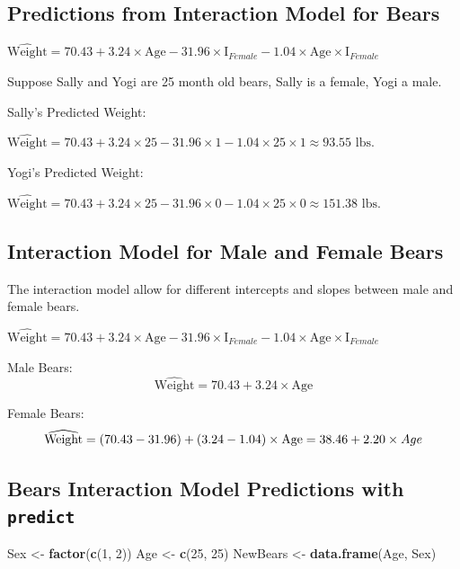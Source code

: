 \documentclass[]{book}
\newenvironment{Shaded}{\begin{snugshade}}{\end{snugshade}}
\newcommand{\KeywordTok}[1]{\textcolor[rgb]{0.13,0.29,0.53}{\textbf{#1}}}
\newcommand{\DecValTok}[1]{\textcolor[rgb]{0.00,0.00,0.81}{#1}}
\newcommand{\StringTok}[1]{\textcolor[rgb]{0.31,0.60,0.02}{#1}}
\newcommand{\NormalTok}[1]{#1}
\begin{document}
\subsection{Predictions from Interaction Model for
Bears}\label{predictions-from-interaction-model-for-bears}

\(\widehat{\text{Weight}}= 70.43 + 3.24 \times\text{Age}- 31.96\times\text{I}_{Female} -1.04\times\text{Age}\times\text{I}_{Female}\)

Suppose Sally and Yogi are 25 month old bears, Sally is a female, Yogi a
male.

Sally's Predicted Weight:

\(\widehat{\text{Weight}}= 70.43+ 3.24 \times 25- 31.96\times1 -1.04\times25\times1 \approx 93.55 \text{ lbs.}\)

Yogi's Predicted Weight:

\(\widehat{\text{Weight}}= 70.43+ 3.24 \times 25- 31.96\times0 -1.04\times25\times0 \approx 151.38 \text{ lbs.}\)

\subsection{Interaction Model for Male and Female
Bears}\label{interaction-model-for-male-and-female-bears}

The interaction model allow for different intercepts and slopes between
male and female bears.

\(\widehat{\text{Weight}}= 70.43 + 3.24 \times\text{Age}- 31.96\times\text{I}_{Female} -1.04\times\text{Age}\times\text{I}_{Female}\)

Male Bears: \[
\widehat{\text{Weight}}= 70.43 + 3.24 \times\text{Age}
\]

Female Bears: \[
\widehat{\text{Weight}}= (70.43 -31.96) + (3.24 -1.04)\times\text{Age} \\
= 38.46 + 2.20\times Age
\]

\subsection{\texorpdfstring{Bears Interaction Model Predictions with
\texttt{predict}}{Bears Interaction Model Predictions with predict}}\label{bears-interaction-model-predictions-with-predict}

\begin{Shaded}
\begin{Highlighting}[]
\NormalTok{Sex <-}\StringTok{ }\KeywordTok{factor}\NormalTok{(}\KeywordTok{c}\NormalTok{(}\DecValTok{1}\NormalTok{, }\DecValTok{2}\NormalTok{))}
\NormalTok{Age <-}\StringTok{ }\KeywordTok{c}\NormalTok{(}\DecValTok{25}\NormalTok{, }\DecValTok{25}\NormalTok{)}
\NormalTok{NewBears <-}\StringTok{ }\KeywordTok{data.frame}\NormalTok{(Age, Sex)}
\end{Highlighting}
\end{Shaded}
\end{document}
